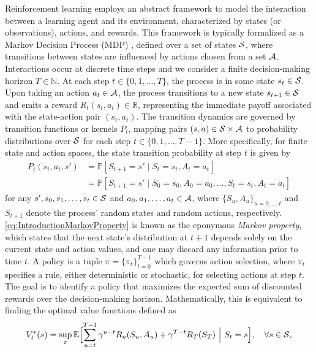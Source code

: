 \documentclass[
    a4paper,
    11pt,
    bibliography=totoc,
    listof=totoc,      
    headinclude=true,
    cleardoublepage=empty,
]{scrbook}
\theoremstyle{plain}
\theoremstyle{definition}
\theoremstyle{remark}
\newcommand{\SetR}{\mathbb R}
\newcommand{\SetN}{\mathbb N}
\newcommand{\E}{\mathbb E}
\newcommand{\PM}{\mathbb P}
\newcommand{\SpaceS}{{\cal S}}
\newcommand{\SpaceA}{{\cal A}}
\begin{document}
Reinforcement learning employs an abstract framework to model the interaction 
between a learning agent and its environment, characterized by states (or 
observations), actions, and rewards. This framework is typically formalized as 
a Markov Decision Process (MDP) \cite{puterman2005_mdpdsdp}, defined over a 
set of states $\SpaceS$, where transitions between states are influenced by actions chosen 
from a set $\SpaceA$. Interactions occur at discrete time steps and we consider a finite 
decision-making horizon $T\in\SetN$. At each step $t\in\{0,1,\dots,T\}$, the 
process is in some state $s_t\in\SpaceS$. Upon taking an action 
$a_t\in\SpaceA$, the process transitions to a new state 
$s_{t+1}\in\SpaceS$ and emits a reward $R_t(s_t,a_t)\in\SetR$, representing 
the immediate payoff associated with the state-action pair $(s_t,a_t)$. The 
transition dynamics are governed by transition functions or kernels $P_t$, 
mapping pairs $(s,a)\in\SpaceS\times\SpaceA$ to probability distributions over 
$\SpaceS$ for each step $t\in\{0,1,\dots,T-1\}$. More specifically, for finite state 
and action spaces, the state transition probability at step $t$ is given by
\begin{equation}
\label{eq:IntroductionMarkovProperty}   
\begin{split}
    P_t(s_t,a_t,s') &= \PM[S_{t+1}=s'\mid S_t=s_t, A_t=a_t] \\
    &=\PM[S_{t+1}=s'\mid S_0=s_0, A_0=a_0, \dots, S_t=s_t, A_t=a_t] 
\end{split}    
\end{equation}
for any $s', s_0,s_1, \dots, s_t\in\SpaceS$ and $a_0,a_1,\dots,a_t\in\SpaceA$, 
where $\{S_u, A_u\}_{u=0,\dots,t}$ and $S_{t+1}$ denote the process' random 
states and random actions, respectively. \cref{eq:IntroductionMarkovProperty} 
is known as the eponymous \textit{Markov property}, which states that the next 
state's distribution at $t+1$ depends solely on the current state and action 
values, and one may discard any information prior to time $t$. A policy is a tuple $\pi = \{\pi_t\}
_{t=0}^{T-1}$ which governs action selection, where $\pi_t$ specifies a rule, either deterministic or stochastic, for selecting actions at step $t$. The goal is to identify a policy that maximizes the 
expected sum of discounted rewards over the decision-making horizon. 
Mathematically, this is equivalent to finding the optimal value functions 
defined as
\begin{equation}
\label{eq:MDPValueFunctionIntroduction}
    V^*_t(s) = \sup_\pi \E\Bigl[
        \sum_{u=t}^{T-1} 
            \gamma^{u-t} R_u(S_u,A_u) + \gamma^{T-t}R_T(S_T) 
        \ \Big|\ S_t=s
    \Bigr], \quad \forall s\in\SpaceS,
\end{equation}
\end{document}
